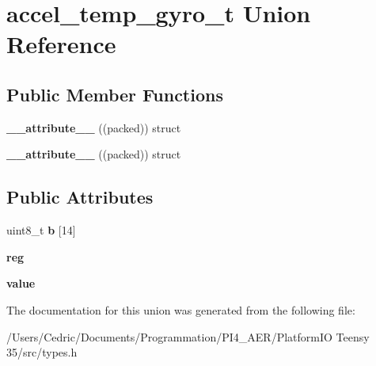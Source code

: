 \hypertarget{unionaccel__temp__gyro__t}{}\section{accel\+\_\+temp\+\_\+gyro\+\_\+t Union Reference}
\label{unionaccel__temp__gyro__t}
\subsection*{Public Member Functions}
\begin{DoxyCompactItemize}
\item 
\mbox{\label{unionaccel__temp__gyro__t_a71c5e8325b3172ce60809d54f2163b68}} 
{\bfseries \+\_\+\+\_\+attribute\+\_\+\+\_\+} ((packed)) struct
\item 
\mbox{\label{unionaccel__temp__gyro__t_a71c5e8325b3172ce60809d54f2163b68}} 
{\bfseries \+\_\+\+\_\+attribute\+\_\+\+\_\+} ((packed)) struct
\end{DoxyCompactItemize}
\subsection*{Public Attributes}
\begin{DoxyCompactItemize}
\item 
\mbox{\label{unionaccel__temp__gyro__t_afe00504a2566e0b450c3a464a87d1234}} 
uint8\+\_\+t {\bfseries b} \mbox{[}14\mbox{]}
\item 
\mbox{\label{unionaccel__temp__gyro__t_aa033a79726b47e0397e3e12f1a8a64da}} 
{\bfseries reg}
\item 
\mbox{\label{unionaccel__temp__gyro__t_ab5e1cd5af4acd99dda35f704b95f4f82}} 
{\bfseries value}
\end{DoxyCompactItemize}


The documentation for this union was generated from the following file\+:\begin{DoxyCompactItemize}
\item 
/\+Users/\+Cedric/\+Documents/\+Programmation/\+P\+I4\+\_\+\+A\+E\+R/\+Platform\+I\+O Teensy 35/src/types.\+h\end{DoxyCompactItemize}
